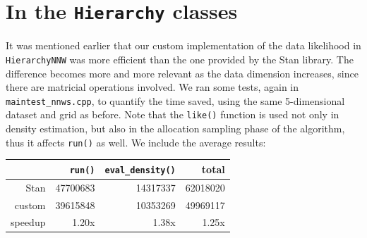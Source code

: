 \section{In the \texttt{Hierarchy} classes}
It was mentioned earlier that our custom implementation of the data likelihood in \verb|HierarchyNNW| was more efficient than the one provided by the Stan library.
The difference becomes more and more relevant as the data dimension increases, since there are matricial operations involved.
We ran some tests, again in \verb|maintest_nnws.cpp|, to quantify the time saved, using the same 5-dimensional dataset and grid as before.
Note that the \verb|like()| function is used not only in density estimation, but also in the allocation sampling phase of the algorithm, thus it affects \verb|run()| as well.
We include the average results:
\begin{center}
	\begin{tabular}{r|r|r|r}
		& \verb|run()| & \verb|eval_density()| & total \\ \hline
		   Stan & 47700683 & 14317337 & 62018020 \\
		 custom & 39615848 & 10353269 & 49969117 \\
		speedup &    1.20x &    1.38x &    1.25x
	\end{tabular}
\end{center}


